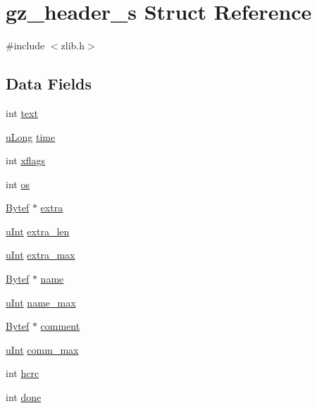 \hypertarget{structgz__header__s}{}\section{gz\+\_\+header\+\_\+s Struct Reference}
\label{structgz__header__s}


{\ttfamily \#include $<$zlib.\+h$>$}

\subsection*{Data Fields}
\begin{DoxyCompactItemize}
\item 
int \hyperlink{structgz__header__s_af94c3fadfed835a501bc1babc4b894f9}{text}
\item 
\hyperlink{zconf_8h_acd2a5701a3aecf6700d2c66c606ecb40}{u\+Long} \hyperlink{structgz__header__s_a5f00bb6f9689c1abf7a54dad449ce9d3}{time}
\item 
int \hyperlink{structgz__header__s_a40e35dc1a967c6537c6012cf5416210a}{xflags}
\item 
int \hyperlink{structgz__header__s_a2708d3180d30b0563e3c2c965865cd4f}{os}
\item 
\hyperlink{zconf_8h_aeb722a888064be47e12d05f692e0f407}{Bytef} $\ast$ \hyperlink{structgz__header__s_a397959afc459da7e296c676a3d4c1915}{extra}
\item 
\hyperlink{zconf_8h_a87d141052bcd5ec8a80812a565c70369}{u\+Int} \hyperlink{structgz__header__s_a271798915d64ae1f0d25a3a814ca0aa3}{extra\+\_\+len}
\item 
\hyperlink{zconf_8h_a87d141052bcd5ec8a80812a565c70369}{u\+Int} \hyperlink{structgz__header__s_ada4b174bf7ec0442b1091011c7342ca1}{extra\+\_\+max}
\item 
\hyperlink{zconf_8h_aeb722a888064be47e12d05f692e0f407}{Bytef} $\ast$ \hyperlink{structgz__header__s_a60ae5eee2882d1c25b3bb328972f0149}{name}
\item 
\hyperlink{zconf_8h_a87d141052bcd5ec8a80812a565c70369}{u\+Int} \hyperlink{structgz__header__s_af503d267de15a461b81dcbbfb0d628e5}{name\+\_\+max}
\item 
\hyperlink{zconf_8h_aeb722a888064be47e12d05f692e0f407}{Bytef} $\ast$ \hyperlink{structgz__header__s_a1d4fd0807e838ce4bfde54aa021e18e9}{comment}
\item 
\hyperlink{zconf_8h_a87d141052bcd5ec8a80812a565c70369}{u\+Int} \hyperlink{structgz__header__s_aa0529f45e5c08b3009cfc2a61a86aea0}{comm\+\_\+max}
\item 
int \hyperlink{structgz__header__s_a29fa8de3acff8d8c7bad61dc924d8564}{hcrc}
\item 
int \hyperlink{structgz__header__s_ab8fd11f59b76a7d031e24bede8679d9d}{done}
\end{DoxyCompactItemize}


